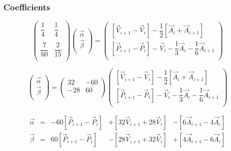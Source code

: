 \documentclass[aps,12pt]{revtex4}
\begin{document}
\subsubsection{Coefficients}

\begin{equation}
\begin{pmatrix}
\dfrac{1}{4} & \dfrac{1}{4} \\
\\
\dfrac{7}{60} & \dfrac{2}{15}\\
\end{pmatrix}
\begin{pmatrix}
\vec{\alpha}\\
\vec{\beta}\\
\end{pmatrix}
=
\begin{pmatrix}
\left[\vec{V}_{i+1}-\vec{V}_{i}\right] - \dfrac{1}{2}\left[\vec{A}_i + \vec{A}_{i+1}\right]\\
\left[\vec{P}_{i+1}-\vec{P}_{i}\right] - \vec{V}_i - \dfrac{1}{3} \vec{A}_i - \dfrac{1}{6} \vec{A}_{i+1}\\
\end{pmatrix}
\end{equation}

\begin{equation}
\begin{pmatrix}
\vec{\alpha}\\
\vec{\beta}\\
\end{pmatrix}
=
\begin{pmatrix}
32  & -60 \\
-28 & 60\\
\end{pmatrix}
\begin{pmatrix}
\left[\vec{V}_{i+1}-\vec{V}_{i}\right] - \dfrac{1}{2}\left[\vec{A}_i + \vec{A}_{i+1}\right]\\
\left[\vec{P}_{i+1}-\vec{P}_{i}\right] - \vec{V}_i - \dfrac{1}{3} \vec{A}_i - \dfrac{1}{6} \vec{A}_{i+1}\\
\end{pmatrix}
\end{equation}

\begin{equation}
\begin{array}{rcrrr}
	\vec{\alpha} & = & -60\left[\vec{P}_{i+1}-\vec{P}_i\right] & + \left[32\vec{V}_{i+1} + 28 \vec{V}_i\right] &  - \left[6\vec{A}_{i+1} -4\vec{A}_{i}\right]\\
	\vec{\beta}  & = & 60\left[\vec{P}_{i+1}-\vec{P}_i\right]   & - \left[28\vec{V}_{i+1} + 32 \vec{V}_i\right] & + \left[4\vec{A}_{i+1}-6\vec{A}_{i}\right]\\
\end{array}
\end{equation}
\end{document}

